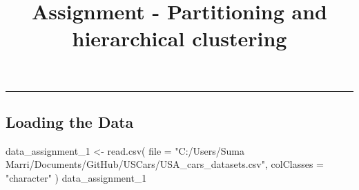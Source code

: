 \documentclass[
]{article}
\title{Assignment - Partitioning and hierarchical clustering}
\author{}
\date{\vspace{-2.5em}}
\newenvironment{Shaded}{\begin{snugshade}}{\end{snugshade}}
\newcommand{\AttributeTok}[1]{\textcolor[rgb]{0.77,0.63,0.00}{#1}}
\newcommand{\FunctionTok}[1]{\textcolor[rgb]{0.00,0.00,0.00}{#1}}
\newcommand{\NormalTok}[1]{#1}
\newcommand{\OtherTok}[1]{\textcolor[rgb]{0.56,0.35,0.01}{#1}}
\newcommand{\StringTok}[1]{\textcolor[rgb]{0.31,0.60,0.02}{#1}}
\begin{document}
\maketitle

\begin{center}\rule{0.5\linewidth}{0.5pt}\end{center}

\hypertarget{loading-the-data}{%
\subsection{Loading the Data}\label{loading-the-data}}

\begin{Shaded}
\begin{Highlighting}[]
\NormalTok{data\_assignment\_1 }\OtherTok{\textless{}{-}} \FunctionTok{read.csv}\NormalTok{(}
  \AttributeTok{file =} \StringTok{"C:/Users/Suma Marri/Documents/GitHub/USCars/USA\_cars\_datasets.csv"}\NormalTok{,}
  \AttributeTok{colClasses =} \StringTok{"character"}
\NormalTok{  )}
\NormalTok{data\_assignment\_1}
\end{Highlighting}
\end{Shaded}
\end{document}
